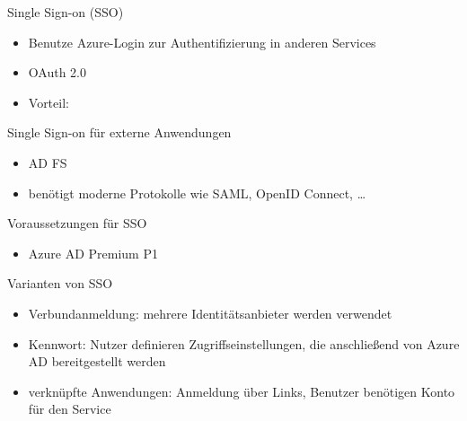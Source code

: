

\begin{flashcard}[Definition]{Single Sign-on (SSO)}
  \begin{itemize}
    \item Benutze Azure-Login zur Authentifizierung in anderen Services
    \item OAuth 2.0
    \item Vorteil: 
  \end{itemize}
\end{flashcard}

\begin{flashcard}[Definition]{Single Sign-on für externe Anwendungen}
  \begin{itemize}
    \item AD FS
    \item benötigt moderne Protokolle wie SAML, OpenID Connect, \ldots
  \end{itemize}
\end{flashcard}

\begin{flashcard}[Definition]{Voraussetzungen für SSO}
  \begin{itemize}
    \item Azure AD Premium P1
  \end{itemize}
\end{flashcard}

\begin{flashcard}[Definition]{Varianten von SSO}
  \begin{itemize}
    \item Verbundanmeldung: mehrere Identitätsanbieter werden verwendet
    \item Kennwort: Nutzer definieren Zugriffseinstellungen, die anschließend von Azure AD bereitgestellt werden
    \item verknüpfte Anwendungen: Anmeldung über Links, Benutzer benötigen Konto für den Service
  \end{itemize}
\end{flashcard}

